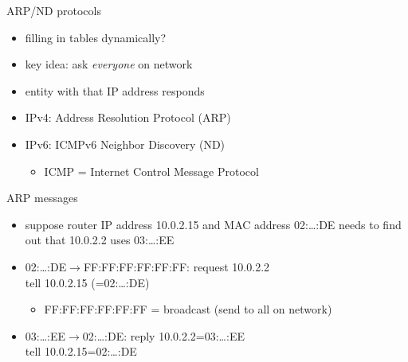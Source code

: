\usetikzlibrary{arrows.meta}
\begin{frame}{ARP/ND protocols}
    \begin{itemize}
    \item filling in tables dynamically?
    \item key idea: ask \textit{everyone} on network
    \item entity with that IP address responds
    \vspace{.5cm}
    \item IPv4: Address Resolution Protocol (ARP)
    \item IPv6: ICMPv6 Neighbor Discovery (ND)
        \begin{itemize}
        \item ICMP = Internet Control Message Protocol
        \end{itemize}
    \end{itemize}
\end{frame}

\begin{frame}{ARP messages}
\begin{itemize}
\item suppose router IP address 10.0.2.15 and MAC address 02:\ldots:DE needs to find out
    that 10.0.2.2 uses 03:\ldots:EE
\vspace{.5cm}
\item 02:\ldots:DE$\rightarrow$FF:FF:FF:FF:FF:FF: request 10.0.2.2 \\
      tell 10.0.2.15 (=02:\ldots:DE)
    \begin{itemize}
    \item FF:FF:FF:FF:FF:FF = broadcast (send to all on network)
    \end{itemize}
\item 03:\ldots:EE$\rightarrow$02:\ldots:DE: reply 10.0.2.2=03:\ldots:EE
    \\ tell 10.0.2.15=02:\ldots:DE
\end{itemize}
\end{frame}

